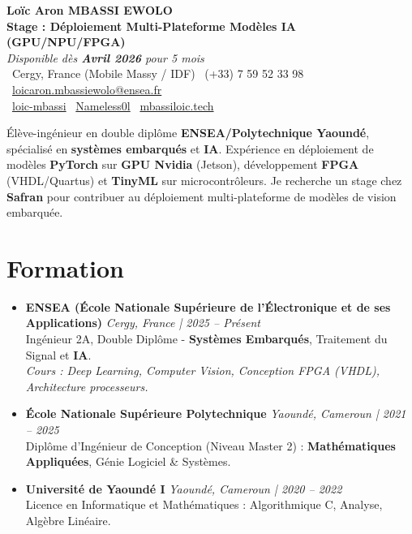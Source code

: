 \documentclass[a4paper,11pt]{article}
\begin{document}
\begin{center}
    {\Large \textbf{Loïc Aron MBASSI EWOLO}} \\ \vspace{4pt}
    \textbf{\large Stage : Déploiement Multi-Plateforme Modèles IA (GPU/NPU/FPGA)} \\
    \textit{\small Disponible dès \textbf{Avril 2026} pour 5 mois}\\
    \vspace{4pt}
    \small
    \faMapMarker\ Cergy, France (Mobile Massy / IDF) \quad
    \faPhone\ (+33) 7 59 52 33 98 \quad
    \faEnvelope\ \href{mailto:loicaron.mbassiewolo@ensea.fr}{loicaron.mbassiewolo@ensea.fr} \\ \vspace{2pt}
    \faLinkedin\ \href{https://www.linkedin.com/in/loic-mbassi}{loic-mbassi} \quad
    \faGithub\ \href{https://github.com/Nameless0l}{Nameless0l} \quad
    \faGlobe\ \href{https://mbassiloic.tech}{mbassiloic.tech}
\end{center}

\vspace{-6pt}

\noindent\small{Élève-ingénieur en double diplôme \textbf{ENSEA/Polytechnique Yaoundé}, spécialisé en \textbf{systèmes embarqués} et \textbf{IA}. Expérience en déploiement de modèles \textbf{PyTorch} sur \textbf{GPU Nvidia} (Jetson), développement \textbf{FPGA} (VHDL/Quartus) et \textbf{TinyML} sur microcontrôleurs. Je recherche un stage chez \textbf{Safran} pour contribuer au déploiement multi-plateforme de modèles de vision embarquée.}

\section{Formation}
\begin{itemize}[leftmargin=*, label={.}, nosep]
    \item \textbf{ENSEA (École Nationale Supérieure de l'Électronique et de ses Applications)} \hfill \textit{Cergy, France | 2025 -- Présent} \\
    \small{Ingénieur 2A, Double Diplôme - \textbf{Systèmes Embarqués}, Traitement du Signal et \textbf{IA}.} \\
    \textit{\small{Cours : Deep Learning, Computer Vision, Conception FPGA (VHDL), Architecture processeurs.}}
    \vspace{2pt}
    \item \textbf{École Nationale Supérieure Polytechnique} \hfill \textit{Yaoundé, Cameroun | 2021 -- 2025} \\
    \small{Diplôme d'Ingénieur de Conception (Niveau Master 2) : \textbf{Mathématiques Appliquées}, Génie Logiciel \& Systèmes.}
    \item \textbf{Université de Yaoundé I} \hfill \textit{Yaoundé, Cameroun | 2020 -- 2022} \\
    \small{Licence en Informatique et Mathématiques : Algorithmique C, Analyse, Algèbre Linéaire.}
\end{itemize}
\end{document}
